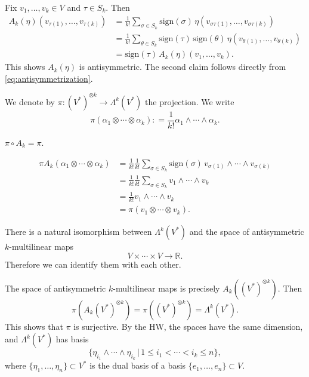 \documentclass{ximera}
\begin{document}
    \begin{solution}
    Fix $v _1, \ldots , v_k \in V$ and $\tau \in S_k$. Then
        \begin{align*}
            A_k ( \eta  )(v_{\tau (1)}, \ldots , v_{\tau (k) })         & = \frac{1}{k!} \sum_{\sigma \in S_k} \text{sign}(\sigma) \, \eta (  v_{\sigma \tau (1)} , \ldots ,  v_{\sigma  \tau (k)}) \\
            & = \frac{1}{k!} \sum _{\theta  \in S_k } \text{sign} (\tau ) \, \text{sign} (\theta) \, \eta (v_{\theta (1) } , \ldots , v_ {\theta (k )}) \\
            & = \text{sign} (\tau )\, A_k ( \eta ) (v_1, \ldots , v_k) . 
         \end{align*}
        This shows $A_k (\eta) $ is antisymmetric. 
    The second claim follows directly from \eqref{eq:antisymmetrization}.
    \end{solution}
    
    We denote by  $\pi : (V^{\ast} )^{\otimes k} \to \Lambda ^k (V ^{\ast} ) $ the projection. We write
    \[   \pi (\alpha _1 \otimes \cdots \otimes \alpha _k ) : = \frac{1}{k! } \alpha _1 \wedge \cdots \wedge \alpha _k  .   \]
    \begin{proposition}
        $\pi \circ A_k = \pi $.
    \end{proposition}
    \begin{solution}
        \begin{align*}
            \pi A_k ( \alpha _1  \otimes \cdots \otimes  \alpha_k )      & = \frac{1}{k!} \frac{1}{k!} \sum_{\sigma \in S_k} \text{sign}(\sigma) \, v_{\sigma (1) } \wedge \cdots \wedge v_{\sigma (k) } \\
            & = \frac{1}{k!} \frac{1}{k!} \sum_{\sigma \in S_k}  v_{1 } \wedge \cdots \wedge v_{k } \\
            & = \frac{1}{k!} v_{1 } \wedge \cdots \wedge v_{k } \\
            & = \pi (  v_1 \otimes \cdots \otimes  v_k ).
        \end{align*}
    \end{solution}

    \begin{theorem}
        There is a natural isomorphism between $\Lambda ^k ( V^{\ast} ) $ and the space of  antisymmetric $k$-multilinear maps 
        \[     V \times \cdots \times V \to \mathbb{R}    .     \]
        Therefore we can identify them with each other.
    \end{theorem}
    \begin{solution}
       The space of antisymmetric $k$-multilinear maps is precisely $A_k ( (V^{\ast })^{\otimes k} )$. Then 
       \[     \pi (A_k (V^{\ast})^{\otimes k}) = \pi ( ( V^{\ast})^{\otimes k} ) = \Lambda ^k (V^{\ast} )   .      \]
       This shows that $\pi$ is surjective. By the HW, the spaces have the same dimension, and $\Lambda ^k (V^{\ast} )$ has basis 
       \[    \{  \eta _{i_1} \wedge \cdots \wedge \eta _{i_k} \,\vert \, 1 \leq i_1 < \cdots < i_k \leq n   \} ,         \]
       where $\{ \eta _1, \ldots , \eta_n \} \subset V^{\ast} $ is the dual basis of a basis $\{ e_1, \ldots , e_n \} \subset V$.
    \end{solution}
\end{document}
